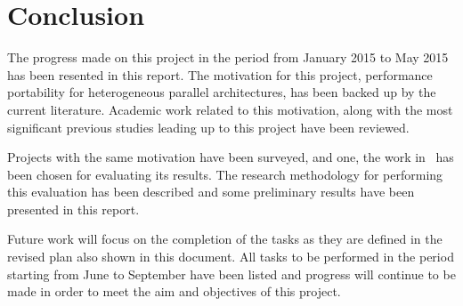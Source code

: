 \chapter{Conclusion}
\label{cha:conclusion}

The progress made on this project in the period from January 2015 to May 2015 has been resented in this report. The motivation for this project, performance portability for heterogeneous parallel architectures, has been backed up by the current literature. Academic work related to this motivation, along with the most significant previous studies leading up to this project have been reviewed.

Projects with the same motivation have been surveyed, and one, the work in~\cite{dolbeau2013one} has been chosen for evaluating its results. The research methodology for performing this evaluation has been described and some preliminary results have been presented in this report.

Future work will focus on the completion of the tasks as they are defined in the revised plan also shown in this document. All tasks to be performed in the period starting from June to September have been listed and progress will continue to be made in order to meet the aim and objectives of this project.
